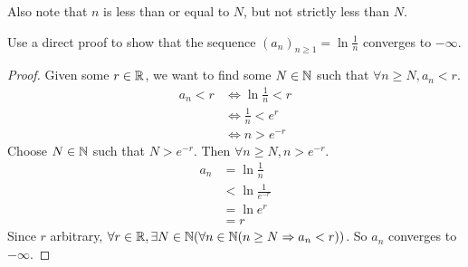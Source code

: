 Also note that $n$ is less than or equal to $N$, but not strictly less than $N$.
\begin{eg}
  Use a direct proof to show that the sequence $(a_n)_{n \geq 1} = \ln \frac{1}{n}$ converges to $-\infty$.
\end{eg}
\begin{proof}
  Given some $r \in \mathbb{R}$, we want to find some $N \in \mathbb{N}$ such that $\forall n \geq N, a_n < r$.
  \begin{align*}
    a_n < r &\iff \ln \frac{1}{n} < r \\
    &\iff \frac{1}{n} < e ^ r \\
    &\iff n > e ^ {-r}
  \end{align*}
  Choose $N \in \mathbb{N}$ such that $N > e ^ {-r}$. Then $\forall n \geq N, n > e ^ {-r}$.
  \begin{align*}
    a_n &= \ln \frac{1}{n} \\
    &< \ln \frac{1}{e ^ {-r}} \\
    &= \ln e ^ r \\
    &= r
  \end{align*}
  Since $r$ arbitrary, $\forall r \in \mathbb{R}, \exists N \in \mathbb{N} (\forall n \in \mathbb{N} (n \geq N \Rightarrow a_n < r))$.
  So $a_n$ converges to $-\infty$.
\end{proof}


